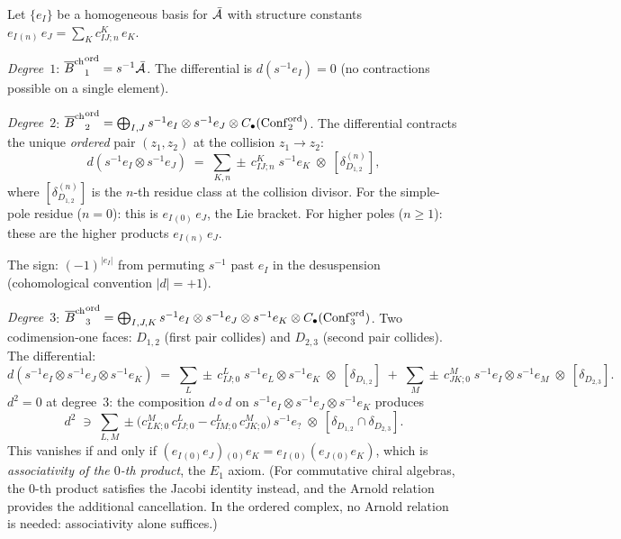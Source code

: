 \begin{construction}
Let $\{e_I\}$ be a homogeneous basis for $\bar{\mathcal{A}}$ with
structure constants $e_I{}_{(n)}\,e_J=\sum_K c^K_{IJ;n}\,e_K$.

\emph{Degree~$1$}: ${\overline{B}^{\mathrm{ch}}}^{\mathrm{ord}}_1=s^{-1}\bar{\mathcal{A}}$.
The differential is $d(s^{-1}e_I)=0$ (no contractions
possible on a single element).

\emph{Degree~$2$}: ${\overline{B}^{\mathrm{ch}}}^{\mathrm{ord}}_2
=\bigoplus_{I,J}s^{-1}e_I\otimes s^{-1}e_J\otimes
C_\bullet(\mathrm{Conf}_2^{\mathrm{ord}})$.
The differential contracts the unique \emph{ordered} pair
$(z_1,z_2)$ at the collision $z_1\to z_2$:
\begin{equation}%
d(s^{-1}e_I\otimes s^{-1}e_J)
\;=\;
\sum_{K,n}\pm\,c^K_{IJ;n}\;s^{-1}e_K
\;\otimes\;
[\delta_{D_{1,2}}^{(n)}],
\end{equation}
where $[\delta_{D_{1,2}}^{(n)}]$ is the $n$-th residue class
at the collision divisor. For the simple-pole residue
($n=0$): this is $e_I{}_{(0)}\,e_J$, the Lie bracket.
For higher poles ($n\ge 1$): these are the higher products
$e_I{}_{(n)}\,e_J$.

The sign: $(-1)^{|e_I|}$ from permuting $s^{-1}$ past
$e_I$ in the desuspension (cohomological convention
$|d|=+1$).

\emph{Degree~$3$}: ${\overline{B}^{\mathrm{ch}}}^{\mathrm{ord}}_3
=\bigoplus_{I,J,K}s^{-1}e_I\otimes s^{-1}e_J\otimes
s^{-1}e_K\otimes
C_\bullet(\mathrm{Conf}_3^{\mathrm{ord}})$.
Two codimension-one faces: $D_{1,2}$ (first pair collides)
and $D_{2,3}$ (second pair collides). The differential:
\begin{equation}%
d(s^{-1}e_I\otimes s^{-1}e_J\otimes s^{-1}e_K)
\;=\;
\sum_L\pm\,c^L_{IJ;0}\;
s^{-1}e_L\otimes s^{-1}e_K
\;\otimes\;[\delta_{D_{1,2}}]
\;+\;
\sum_M\pm\,c^M_{JK;0}\;
s^{-1}e_I\otimes s^{-1}e_M
\;\otimes\;[\delta_{D_{2,3}}].
\end{equation}
$d^2=0$ at degree~$3$: the composition $d\circ d$ on
$s^{-1}e_I\otimes s^{-1}e_J\otimes s^{-1}e_K$ produces
\[
d^2\;\ni\;
\sum_{L,M}\pm\bigl(
c^M_{LK;0}\,c^L_{IJ;0}
-c^L_{IM;0}\,c^M_{JK;0}
\bigr)\,s^{-1}e_?
\;\otimes\;[\delta_{D_{1,2}}\cap\delta_{D_{2,3}}].
\]
This vanishes if and only if
$(e_I{}_{(0)}e_J){}_{(0)}e_K
=e_I{}_{(0)}(e_J{}_{(0)}e_K)$,
which is \emph{associativity of the $0$-th product}, the
$E_1$ axiom. (For commutative chiral algebras, the
$0$-th product satisfies the Jacobi identity instead,
and the Arnold relation provides the additional
cancellation. In the ordered complex, no Arnold relation
is needed: associativity alone suffices.)
\end{construction}

